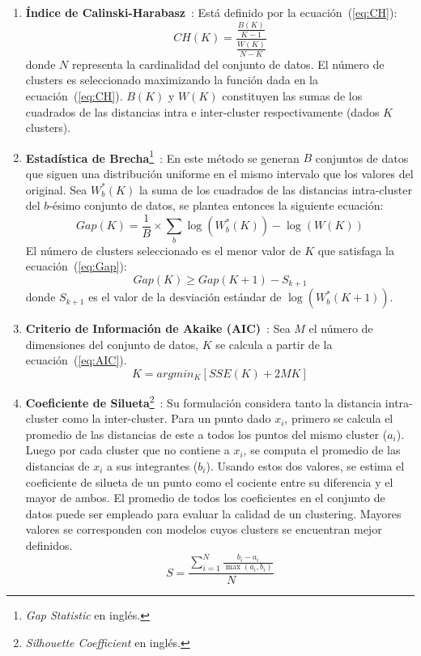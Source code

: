 \begin{enumerate}
    \item \textbf{Índice de Calinski-Harabasz}~\cite{Calinski74}: Está definido por la ecuación~(\ref{eq:CH}):
    \begin{equation}
        \label{eq:CH}
        CH(K)=\frac{\frac{B(K)}{K-1}}{\frac{W(K)}{N-K}}
    \end{equation}
    donde $N$ representa la cardinalidad del conjunto de datos.
    El número de clusters es seleccionado maximizando la función dada en la ecuación~(\ref{eq:CH}).
    $B(K)$ y $W(K)$ constituyen las sumas de los cuadrados de las distancias intra e inter-cluster respectivamente (dados $K$ clusters).

    \item \textbf{Estadística de Brecha}\footnote{\textit{Gap Statistic} en inglés.}~\cite{Tibshirani01}: En este método se generan $B$ conjuntos de datos que siguen una distribución uniforme en el mismo intervalo que los valores del original.
    Sea $W_{b}^{*}(K)$ la suma de los cuadrados de las distancias intra-cluster del $b$-ésimo conjunto de datos, se plantea entonces la siguiente ecuación:
    \begin{equation}
        Gap(K) = \frac{1}{B} \times\sum_{b}{\log(W_{b}^{*}(K)) - \log(W(K))}
    \end{equation}
    El número de clusters seleccionado es el menor valor de $K$ que satisfaga la ecuación~(\ref{eq:Gap}):
    \begin{equation}
        \label{eq:Gap}
        Gap(K) \geq Gap(K+1) - S_{k+1}
    \end{equation}
    donde $S_{k+1}$ es el valor de la desviación estándar de $\log(W_{b}^{*}(K+1))$.

    \item \textbf{Criterio de Información de Akaike (AIC)}~\cite{Yeung01}: Sea $M$ el número de dimensiones del conjunto de datos, $K$ se calcula a partir de la ecuación~(\ref{eq:AIC}).
    \begin{equation}
        \label{eq:AIC}
        K=argmin_{K}[SSE(K)+2M K]
    \end{equation}

    \item \textbf{Coeficiente de Silueta}\footnote{\textit{Silhouette Coefficient} en inglés.}~\cite{Kaufman90}: Su formulación considera tanto la distancia intra-cluster como la inter-cluster.
    Para un punto dado $x_i$, primero se calcula el promedio de las distancias de este a todos los puntos del mismo cluster ($a_i$).
    Luego por cada cluster que no contiene a $x_i$, se computa el promedio de las distancias de $x_i$ a sus integrantes ($b_i$).
    Usando estos dos valores, se estima el coeficiente de silueta de un punto como el cociente entre su diferencia y el mayor de ambos.
    El promedio de todos los coeficientes en el conjunto de datos puede ser empleado para evaluar la calidad de un clustering.
    Mayores valores se corresponden con modelos cuyos clusters se encuentran mejor definidos.
    \begin{equation}
        S = \frac{\sum_{i=1}^{N}{\frac{b_{i}-a_{i}}{\max(a_i,b_i)}}}{N}
    \end{equation}
\end{enumerate}

